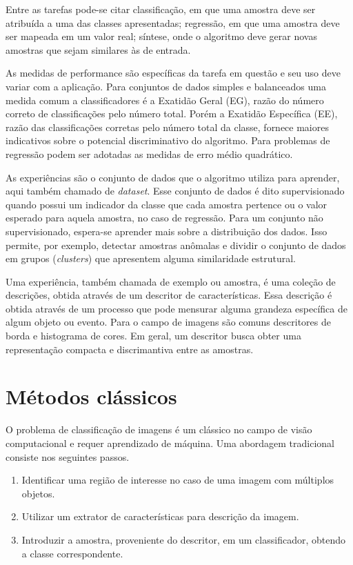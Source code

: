 Entre as tarefas pode-se citar classificação, em que uma amostra deve ser atribuída a uma das classes apresentadas; regressão, em que uma amostra deve ser mapeada em um valor real; síntese, onde o algoritmo deve gerar novas amostras que sejam similares às de entrada.

As medidas de performance são específicas da tarefa em questão e seu uso deve variar com a aplicação. Para conjuntos de dados simples e balanceados uma medida comum a classificadores é a Exatidão Geral (EG), razão do número correto de classificações pelo número total. Porém a Exatidão Específica (EE), razão das classificações corretas pelo número total da classe, fornece maiores indicativos sobre o potencial discriminativo do algoritmo. Para problemas de regressão podem ser adotadas as medidas de erro médio quadrático.

As experiências são o conjunto de dados que o algoritmo utiliza para aprender, aqui também chamado de \textit{dataset}. Esse conjunto de dados é dito supervisionado quando possui um indicador da classe que cada amostra pertence ou o valor esperado para aquela amostra, no caso de regressão. Para um conjunto não supervisionado, espera-se aprender mais sobre a distribuição dos dados. Isso permite, por exemplo, detectar amostras anômalas e dividir o conjunto de dados em grupos (\textit{clusters}) que apresentem alguma similaridade estrutural.

Uma experiência, também chamada de exemplo ou amostra, é uma coleção de descrições, obtida através de um descritor de características. Essa descrição é obtida através de um processo que pode mensurar alguma grandeza específica de algum objeto ou evento. Para o campo de imagens são comuns descritores de borda e histograma de cores. Em geral, um descritor busca obter uma representação compacta e discrimantiva entre as amostras. 


\section{Métodos clássicos}
O problema de classificação de imagens é um clássico no campo de visão computacional e requer aprendizado de máquina. Uma abordagem tradicional consiste nos seguintes passos.
	\begin{enumerate}
	\item Identificar uma região de interesse no caso de uma imagem com múltiplos objetos.
	\item Utilizar um extrator de características para descrição da imagem.
	\item Introduzir a amostra, proveniente do descritor, em um classificador, obtendo a classe correspondente.
	\end{enumerate}

